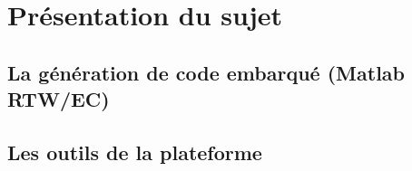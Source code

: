 \chapter{Présentation du sujet}
\lipsum

\section{La génération de code embarqué (Matlab RTW/EC)}
\lipsum

\section{Les outils de la plateforme}
\lipsum
